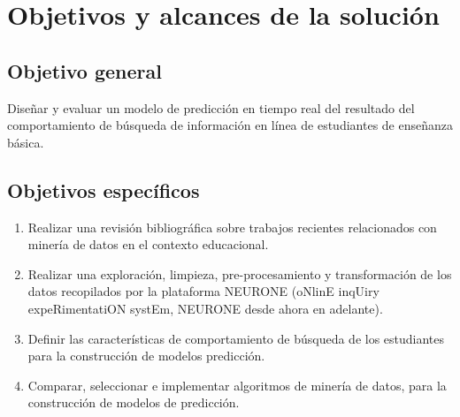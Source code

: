 \chapter{Objetivos y alcances de la solución}
\label{chp:objetivos}
\setcounter{page}{1}

\section{Objetivo general}
\label{sec:objetivo-general}
Diseñar y evaluar un modelo de predicción en tiempo real del resultado del comportamiento de búsqueda de información en línea de estudiantes de enseñanza básica.


\section{Objetivos específicos}
\label{sec:objetivo-especificos}

\begin{enumerate}
	\item Realizar una revisión bibliográfica sobre trabajos recientes relacionados con minería de datos en el contexto educacional.
	\item Realizar una exploración, limpieza, pre-procesamiento y transformación de los datos recopilados por la plataforma NEURONE (oNlinE inqUiry expeRimentatiON systEm, NEURONE desde ahora en adelante).
	\item Definir las características de comportamiento de búsqueda de los estudiantes para la construcción de modelos predicción.
	\item Comparar, seleccionar e implementar algoritmos de minería de datos, para la construcción de modelos de predicción.
\end{enumerate}